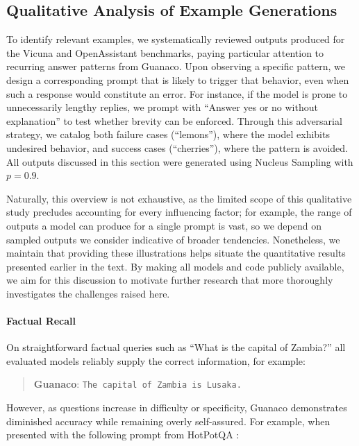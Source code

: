 \subsection{Qualitative Analysis of Example Generations}
\label{ssec:examples}

To identify relevant examples, we systematically reviewed outputs produced for the Vicuna and OpenAssistant benchmarks, paying particular attention to recurring answer patterns from {Guanaco}. Upon observing a specific pattern, we design a corresponding prompt that is likely to trigger that behavior, even when such a response would constitute an error. For instance, if the model is prone to unnecessarily lengthy replies, we prompt with ``Answer yes or no without explanation'' to test whether brevity can be enforced. Through this adversarial strategy, we catalog both failure cases (“lemons”), where the model exhibits undesired behavior, and success cases (“cherries”), where the pattern is avoided. All outputs discussed in this section were generated using Nucleus Sampling \cite{holtzmancurious} with $p=0.9$.

Naturally, this overview is not exhaustive, as the limited scope of this qualitative study precludes accounting for every influencing factor; for example, the range of outputs a model can produce for a single prompt is vast, so we depend on sampled outputs we consider indicative of broader tendencies. Nonetheless, we maintain that providing these illustrations helps situate the quantitative results presented earlier in the text. By making all models and code publicly available, we aim for this discussion to motivate further research that more thoroughly investigates the challenges raised here.
\paragraph{Factual Recall} On straightforward factual queries such as ``What is the capital of Zambia?'' all evaluated models reliably supply the correct information, for example:

\begin{quote}
    \textbf{Guanaco}:
    \texttt{The capital of Zambia is Lusaka.}
\end{quote}

 However, as questions increase in difficulty or specificity, {Guanaco} demonstrates diminished accuracy while remaining overly self-assured. For example, when presented with the following prompt from HotPotQA \citep{yang2018hotpotqa}:

